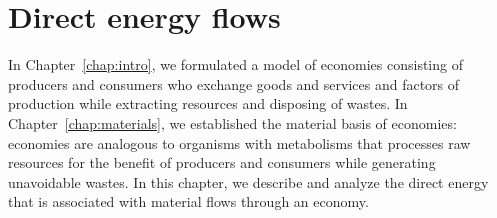 %
%
%


\chapter{Direct energy flows}
\label{chap:direct_energy} 






In Chapter~\ref{chap:intro}, we formulated a model of economies
consisting of producers and consumers who exchange
goods and services and factors of production 
while extracting resources and disposing of wastes. 
In Chapter~\ref{chap:materials}, we established the material basis of economies: 
economies are analogous to organisms with metabolisms that processes
raw resources for the benefit of producers and consumers 
while generating unavoidable wastes.
In this chapter, we describe and analyze the 
direct energy
that is associated with material flows
through an economy.


